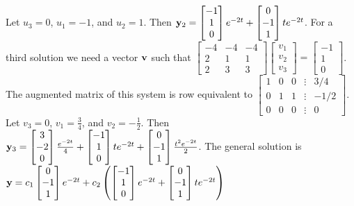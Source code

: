 \documentclass{ximera}
\begin{document}
\begin{problem}
\begin{solution}
Let $u_3=0$, $u_1=-1$, and $u_2=1$. Then
${\bf y}_2= \begin{bmatrix}-1\\1\\0 \end{bmatrix}e^{-2t}+ \begin{bmatrix}0\\-1\\1 \end{bmatrix}te^{-2t}$.
For a third solution we need a vector ${\bf v}$ such that
$  \begin{bmatrix}-4&-4&-4\\2&1&1\\2&3&3 \end{bmatrix} \begin{bmatrix}v_1\\v_2\\v_3 \end{bmatrix}
=  \begin{bmatrix}-1\\1\\0 \end{bmatrix}$.
The augmented matrix of this system is row equivalent to
$  \begin{bmatrix}1&0&0&\vdots&3/4\\0&1&1&
\vdots&-1/2\\0&0&0&\vdots&0 \end{bmatrix}$.
Let $v_3=0$, $v_1=\frac{3 }{4}$, and $v_2=-\frac{1 }{2}$. Then
${\bf y}_3=  \begin{bmatrix}3\\-2\\0 \end{bmatrix} \frac{e^{-2t} }{4}+ \begin{bmatrix}-1\\1\\0 \end{bmatrix}t
e^{-2t}+ \begin{bmatrix}0\\-1\\1 \end{bmatrix}\frac{t^2e^{-2t} }{2}$.
The general solution is
${\bf y}= c_1 \begin{bmatrix}0\\-1\\1 \end{bmatrix}e^{-2t}+
c_2\left( \begin{bmatrix}-1\\1\\0 \end{bmatrix}e^{-2t}+ \begin{bmatrix}0\\-1\\1 \end{bmatrix}te^{-2t}\right)$

\end{solution}
\end{problem}
\end{document}

